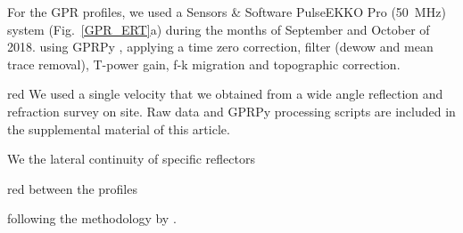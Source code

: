 \documentclass[5p]{elsarticle}
\newcommand{\COMON}{\begin{color}{blue}}
\newcommand{\COMOFF}{\end{color}}
\newcommand{\alon}{\begin{color}{red}}
\newcommand{\aloff}{\end{color}}
\begin{document}

For the GPR profiles, we used a Sensors \& Software
PulseEKKO Pro (\SI{50}{\mega Hz}) system (Fig.~\ref{GPR_ERT}a) during the
months of September and October of 2018.  using GPRPy
\citep{plattner2019comunity,Plattner2019}, applying a time zero
correction, filter (dewow and mean trace removal), T-power gain, f-k
migration \citep{stolt1978migration} and topographic correction. \alon
We used a single velocity that we obtained from a wide angle
reflection and refraction survey on site. Raw data and GPRPy
processing scripts are included in the supplemental material of this
article. \aloff We  the lateral continuity of specific reflectors \alon
between the profiles \aloff following the methodology by
\citep{mitchum1977seismic}.


\end{document}

